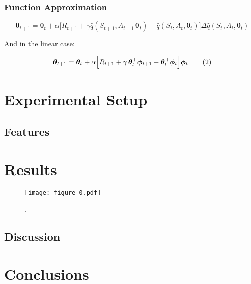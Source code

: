 \documentclass{article}
\begin{document}
	\subsubsection{Function Approximation}



	\begin{equation}\label{eqn:update}
	\bm{\theta}_{t+1} =
	\bm{\theta}_t +
	\alpha \Big[
		R_{t+1} +
		\gamma \hat{q}(S_{t+1}, A_{t+1}\, \bm{\theta}_t)
		- \hat{q}(S_t, A_t, \bm{\theta}_t)
	\Big]
	\Delta\hat{q}(S_t, A_t, \bm{\theta}_t)\tag{1}
	\end{equation}

	And in the linear case:

	\begin{equation}\label{eqn:linear_update}
		\bm{\theta}_{t+1} =
		\bm{\theta}_t +
			\alpha \Big[
				R_{t+1} + \gamma\, \bm{\theta}_t^\top\bm{\phi}_{t+1} \space
				- \bm{\theta}_t^\top\bm{\phi}_t
			\Big]\bm{\phi}_t\tag{2}
	\end{equation}




	\section{Experimental Setup}

	\subsection{Features}



	\section{Results}


		\begin{figure}[h]
			\begin{center}
				\texttt{[image: figure\_0.pdf]}
				\caption{.}
			\end{center}
		\end{figure}

	\subsection{Discussion}



	\section{Conclusions}


	\clearpage
\end{document}

